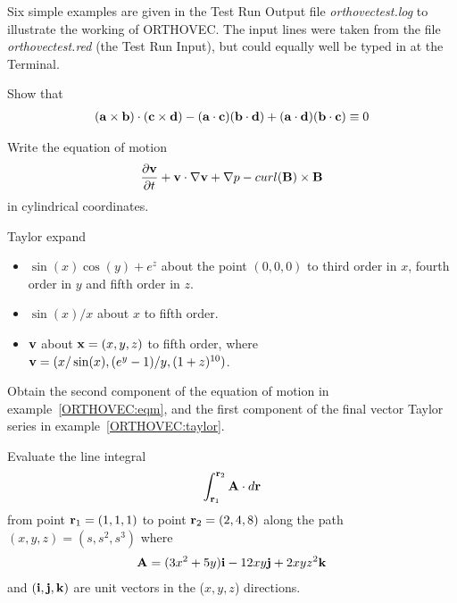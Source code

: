 Six  simple examples are given in the Test Run Output file
{\em orthovectest.log} to illustrate the working of ORTHOVEC.
The input lines were taken from the file
{\em orthovectest.red} (the Test Run Input), but could
equally well be typed in at the Terminal.

\example{}

Show that
\begin{eqnarray*}
({\bf a}  \times {\bf b}) \cdot ({\bf c} \times {\bf d}) - ({\bf a}
\cdot {\bf c})({\bf b} \cdot {\bf d})
 + ({\bf a} \cdot {\bf d})({\bf b} \cdot {\bf c}) \equiv 0
\end{eqnarray*}

\example{}\label{ORTHOVEC:eqm}

Write the equation of motion
\begin{eqnarray*}
\frac{\partial {\bf v}}{\partial t} + {\bf v} \cdot {\bf \nabla v}
+ {\bf \nabla} p - curl ({\bf B}) \times {\bf B}
\end{eqnarray*}
in cylindrical coordinates.

\example{}\label{ORTHOVEC:taylor}

Taylor expand
\begin{itemize}
\item $\sin(x) \cos(y) +e^z$
about the point $(0,0,0)$ to third order in $x$, fourth order in $y$ and
fifth order in $z$.

\item $\sin(x)/x$ about $x$ to fifth order.

\item ${\bf v}$ about ${\bf x}=(x,y,z)$ to fifth order, where
${\bf v} = (x/ \sin(x),(e^y-1)/y,(1+z)^{10})$.
\end{itemize}

\example{}

Obtain the second component of the equation of motion in
example~\ref{ORTHOVEC:eqm}, and the first component of the final
vector Taylor series in example~\ref{ORTHOVEC:taylor}.

\example{}

Evaluate the line integral
\begin{eqnarray*}
\int^{{\bf r}_2}_{{\bf r}_1} {\bf A} \cdot d{\bf r}
\end{eqnarray*}
from point ${\bf r}_1 = (1,1,1)$ to point
${\bf r}_2 = (2,4,8)$ along the path $(x,y,z) = (s, s^2, s^3)$ where\\
\begin{eqnarray*}
{\bf A} = (3x^2 + 5y) {\bf i} - 12xy{\bf j} + 2xyz^2{\bf k}
\end{eqnarray*}
and $({\bf i, j, k})$ are unit vectors in the ($x,y,z$) directions.

